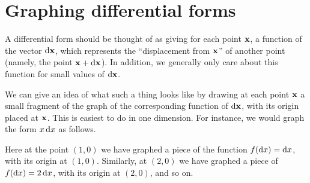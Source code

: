 \documentclass[12pt]{amsart}
\begin{document}
\section{Graphing differential forms}
\label{sec:graphing-differential-forms}

A differential form should be thought of as giving for each point $\mathbf{x}$, a function of the vector $\mathrm{d} \mathbf{x}$, which represents the ``displacement from $\mathbf{x}$'' of another point (namely, the point $\mathbf{x}+\mathrm{d} \mathbf{x}$).
In addition, we generally only care about this function for small values of $\mathrm{d} \mathbf{x}$.

We can give an idea of what such a thing looks like by drawing at each point $\mathbf{x}$ a small fragment of the graph of the corresponding function of $\mathrm{d} \mathbf{x}$, with its origin placed at $\mathbf{x}$.
This is easiest to do in one dimension.
For instance, we would graph the form $x\,\mathrm{d} x$ as follows.
\begin{center}
\end{center}
Here at the point $(1,0)$ we have graphed a piece of the function $f(\mathrm{d} x) = \mathrm{d} x$, with its origin at $(1,0)$.
Similarly, at $(2,0)$ we have graphed a piece of $f(\mathrm{d} x) = 2\,\mathrm{d} x$, with its origin at $(2,0)$, and so on.
\end{document}
